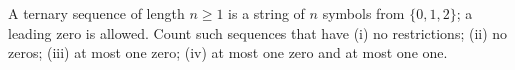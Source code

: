 A ternary sequence of length $n\ge1$ is a string of $n$ symbols from $\{0,1,2\}$; a leading zero is allowed. Count such sequences that have (i) no restrictions; (ii) no zeros; (iii) at most one zero; (iv) at most one zero and at most one one.
